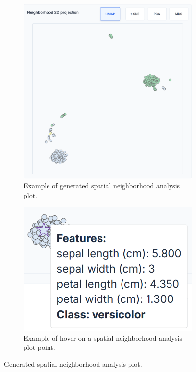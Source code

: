 \begin{figure}[ht!]
    \centering
    \begin{subfigure}[c]{0.68\textwidth}
        \centering
        \includegraphics[width=\textwidth]{images/scatterPlotFinal.png}
        \caption{Example of generated spatial neighborhood analysis plot.}
        \label{fig:scatterPlotFinal}
    \end{subfigure}
    \hfill
    \begin{subfigure}[c]{0.28\textwidth}
        \centering
        \includegraphics[width=\textwidth]{images/scatterPlotFinalHover.png}
        \caption{Example of hover on a spatial neighborhood analysis plot point.}
        \label{fig:scatterPlotFinalHover}
    \end{subfigure}

    \caption{Generated spatial neighborhood analysis plot.}
\end{figure}

